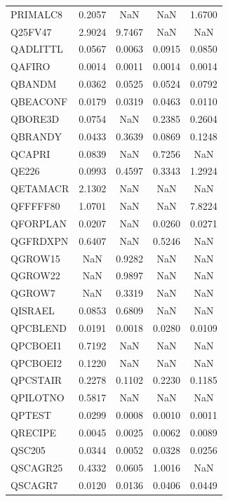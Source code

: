 \begin{longtable}{lcccc}
PRIMALC8 &   0.2057 &      NaN &      NaN &   1.6700 \\
Q25FV47  &   2.9024 &   9.7467 &      NaN &      NaN \\
QADLITTL &   0.0567 &   0.0063 &   0.0915 &   0.0850 \\
QAFIRO   &   0.0014 &   0.0011 &   0.0014 &   0.0014 \\
QBANDM   &   0.0362 &   0.0525 &   0.0524 &   0.0792 \\
QBEACONF &   0.0179 &   0.0319 &   0.0463 &   0.0110 \\
QBORE3D  &   0.0754 &      NaN &   0.2385 &   0.2604 \\
QBRANDY  &   0.0433 &   0.3639 &   0.0869 &   0.1248 \\
QCAPRI   &   0.0839 &      NaN &   0.7256 &      NaN \\
QE226    &   0.0993 &   0.4597 &   0.3343 &   1.2924 \\
QETAMACR &   2.1302 &      NaN &      NaN &      NaN \\
QFFFFF80 &   1.0701 &      NaN &      NaN &   7.8224 \\
QFORPLAN &   0.0207 &      NaN &   0.0260 &   0.0271 \\
QGFRDXPN &   0.6407 &      NaN &   0.5246 &      NaN \\
QGROW15  &      NaN &   0.9282 &      NaN &      NaN \\
QGROW22  &      NaN &   0.9897 &      NaN &      NaN \\
QGROW7   &      NaN &   0.3319 &      NaN &      NaN \\
QISRAEL  &   0.0853 &   0.6809 &      NaN &      NaN \\
QPCBLEND &   0.0191 &   0.0018 &   0.0280 &   0.0109 \\
QPCBOEI1 &   0.7192 &      NaN &      NaN &      NaN \\
QPCBOEI2 &   0.1220 &      NaN &      NaN &      NaN \\
QPCSTAIR &   0.2278 &   0.1102 &   0.2230 &   0.1185 \\
QPILOTNO &   0.5817 &      NaN &      NaN &      NaN \\
QPTEST   &   0.0299 &   0.0008 &   0.0010 &   0.0011 \\
QRECIPE  &   0.0045 &   0.0025 &   0.0062 &   0.0089 \\
QSC205   &   0.0344 &   0.0052 &   0.0328 &   0.0256 \\
QSCAGR25 &   0.4332 &   0.0605 &   1.0016 &      NaN \\
QSCAGR7  &   0.0120 &   0.0136 &   0.0406 &   0.0449 \\

\end{longtable}
